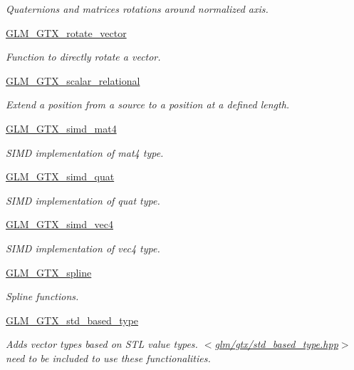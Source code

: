 \begin{DoxyCompactItemize}
\begin{DoxyCompactList}\small\item\em Quaternions and matrices rotations around normalized axis. \end{DoxyCompactList}\item 
\hyperlink{group__gtx__rotate__vector}{G\+L\+M\+\_\+\+G\+T\+X\+\_\+rotate\+\_\+vector}
\begin{DoxyCompactList}\small\item\em Function to directly rotate a vector. \end{DoxyCompactList}\item 
\hyperlink{group__gtx__scalar__relational}{G\+L\+M\+\_\+\+G\+T\+X\+\_\+scalar\+\_\+relational}
\begin{DoxyCompactList}\small\item\em Extend a position from a source to a position at a defined length. \end{DoxyCompactList}\item 
\hyperlink{group__gtx__simd__mat4}{G\+L\+M\+\_\+\+G\+T\+X\+\_\+simd\+\_\+mat4}
\begin{DoxyCompactList}\small\item\em S\+I\+M\+D implementation of mat4 type. \end{DoxyCompactList}\item 
\hyperlink{group__gtx__simd__quat}{G\+L\+M\+\_\+\+G\+T\+X\+\_\+simd\+\_\+quat}
\begin{DoxyCompactList}\small\item\em S\+I\+M\+D implementation of quat type. \end{DoxyCompactList}\item 
\hyperlink{group__gtx__simd__vec4}{G\+L\+M\+\_\+\+G\+T\+X\+\_\+simd\+\_\+vec4}
\begin{DoxyCompactList}\small\item\em S\+I\+M\+D implementation of vec4 type. \end{DoxyCompactList}\item 
\hyperlink{group__gtx__spline}{G\+L\+M\+\_\+\+G\+T\+X\+\_\+spline}
\begin{DoxyCompactList}\small\item\em Spline functions. \end{DoxyCompactList}\item 
\hyperlink{group__gtx__std__based__type}{G\+L\+M\+\_\+\+G\+T\+X\+\_\+std\+\_\+based\+\_\+type}
\begin{DoxyCompactList}\small\item\em Adds vector types based on S\+T\+L value types. $<$\hyperlink{std__based__type_8hpp}{glm/gtx/std\+\_\+based\+\_\+type.\+hpp}$>$ need to be included to use these functionalities. \end{DoxyCompactList}\item 

\end{DoxyCompactItemize}
